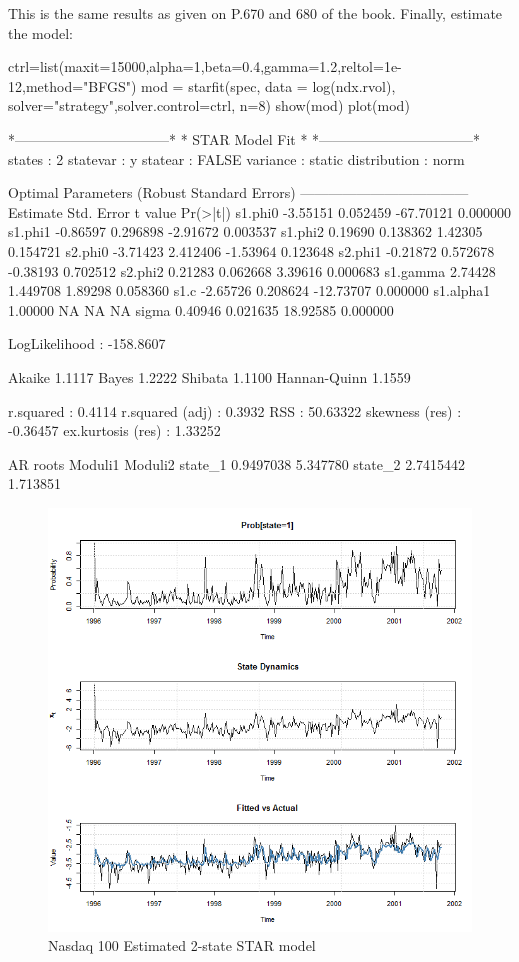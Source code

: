 This is the same results as given on P.670 and 680 of the \cite{Zivot2007} book.
Finally, estimate the model:
\begin{Schunk}
\begin{Sinput}
ctrl=list(maxit=15000,alpha=1,beta=0.4,gamma=1.2,reltol=1e-12,method="BFGS")
mod = starfit(spec, data = log(ndx.rvol),
solver="strategy",solver.control=ctrl, n=8)
show(mod)
plot(mod)
\end{Sinput}
\begin{Soutput}
*---------------------------------*
*          STAR Model Fit         *
*---------------------------------*
states       : 2
statevar     : y
statear      : FALSE
variance     : static
distribution : norm

Optimal Parameters (Robust Standard Errors)
------------------------------------
           Estimate  Std. Error   t value Pr(>|t|)
s1.phi0    -3.55151    0.052459 -67.70121 0.000000
s1.phi1    -0.86597    0.296898  -2.91672 0.003537
s1.phi2     0.19690    0.138362   1.42305 0.154721
s2.phi0    -3.71423    2.412406  -1.53964 0.123648
s2.phi1    -0.21872    0.572678  -0.38193 0.702512
s2.phi2     0.21283    0.062668   3.39616 0.000683
s1.gamma    2.74428    1.449708   1.89298 0.058360
s1.c       -2.65726    0.208624 -12.73707 0.000000
s1.alpha1   1.00000          NA        NA       NA
sigma       0.40946    0.021635  18.92585 0.000000

LogLikelihood : -158.8607 
                   
Akaike       1.1117
Bayes        1.2222
Shibata      1.1100
Hannan-Quinn 1.1559

r.squared         :  0.4114
r.squared (adj)   :  0.3932
RSS               :  50.63322
skewness (res)    :  -0.36457
ex.kurtosis (res) :  1.33252

AR roots
          Moduli1  Moduli2
state_1 0.9497038 5.347780
state_2 2.7415442 1.713851
\end{Soutput}
\end{Schunk}
\begin{figure}[ht]
\centering
\includegraphics[scale=0.35]{ndxfit}
\caption{Nasdaq 100 Estimated 2-state STAR model}
\label{fig:ndxfit}
\end{figure}
